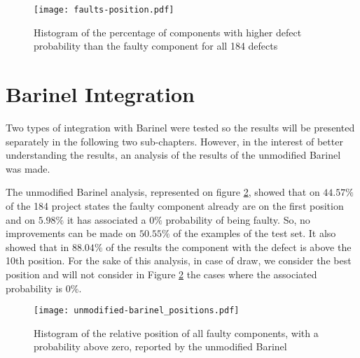 \begin{figure}[ht]
  \begin{center}
    \leavevmode
    \texttt{[image: faults-position.pdf]}
    \caption{Histogram of the percentage of components with higher defect probability than the faulty component for all 184 defects}
    \label{fig:dp-faults-position}
  \end{center}
\end{figure}



\section{Barinel Integration}

Two types of integration with Barinel were tested so the results will be presented separately in the following two sub-chapters. However, in the interest of better understanding the results, an analysis of the results of the unmodified Barinel was made.

The unmodified Barinel analysis, represented on figure \ref{fig:fault-positions}, showed that on $44.57\%$ of the 184 project states the faulty component already are on the first position and on $5.98\%$ it has associated a $0\%$ probability of being faulty. So, no improvements can be made on $50.55\%$ of the examples of the test set. It also showed that in $88.04\%$ of the results the component with the defect is above the 10th position. For the sake of this analysis, in case of draw, we consider the best position and will not consider in Figure \ref{fig:fault-positions} the cases where the associated probability is $0\%$.

\begin{figure}[ht]
  \begin{center}
    \leavevmode
    \texttt{[image: unmodified-barinel\_positions.pdf]}
    \caption{Histogram of the relative position of all faulty components, with a probability above zero, reported by the unmodified Barinel}
    \label{fig:fault-positions}
  \end{center}
\end{figure}


